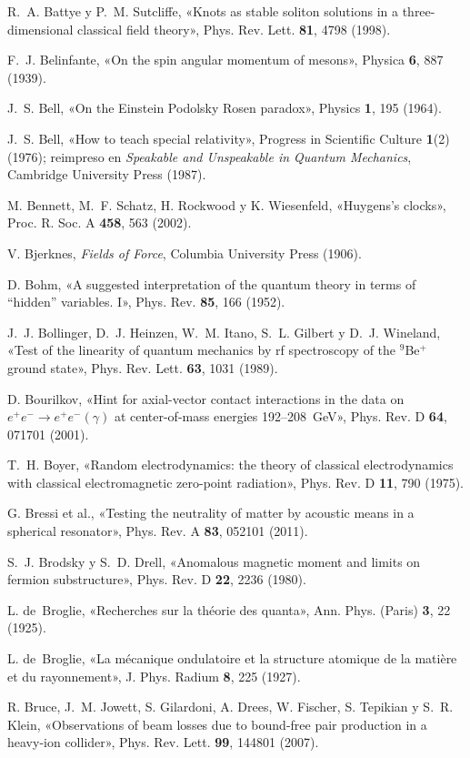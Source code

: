 \documentclass[11pt,a4paper]{article}
\begin{document}
\begin{list}{}{\setlength{\leftmargin}{1.5em}\setlength{\itemindent}{-1.5em}\setlength{\itemsep}{0.15em}\small}
\item R.~A. Battye y P.~M. Sutcliffe, «Knots as stable soliton solutions in a three-dimensional classical field theory», Phys. Rev. Lett. \textbf{81}, 4798 (1998).
\item F.~J. Belinfante, «On the spin angular momentum of mesons», Physica \textbf{6}, 887 (1939).
\item J.~S. Bell, «On the Einstein Podolsky Rosen paradox», Physics \textbf{1}, 195 (1964).
\item J.~S. Bell, «How to teach special relativity», Progress in Scientific Culture \textbf{1}(2) (1976); reimpreso en \emph{Speakable and Unspeakable in Quantum Mechanics}, Cambridge University Press (1987).
\item M. Bennett, M.~F. Schatz, H. Rockwood y K. Wiesenfeld, «Huygens's clocks», Proc. R. Soc. A \textbf{458}, 563 (2002).
\item V. Bjerknes, \emph{Fields of Force}, Columbia University Press (1906).
\item D. Bohm, «A suggested interpretation of the quantum theory in terms of ``hidden'' variables. I», Phys. Rev. \textbf{85}, 166 (1952).
\item J.~J. Bollinger, D.~J. Heinzen, W.~M. Itano, S.~L. Gilbert y D.~J. Wineland, «Test of the linearity of quantum mechanics by rf spectroscopy of the ${}^9$Be$^+$ ground state», Phys. Rev. Lett. \textbf{63}, 1031 (1989).
\item D. Bourilkov, «Hint for axial-vector contact interactions in the data on $e^+e^-\to e^+e^-(\gamma)$ at center-of-mass energies 192--208~GeV», Phys. Rev. D \textbf{64}, 071701 (2001).
\item T.~H. Boyer, «Random electrodynamics: the theory of classical electrodynamics with classical electromagnetic zero-point radiation», Phys. Rev. D \textbf{11}, 790 (1975).
\item G. Bressi et al., «Testing the neutrality of matter by acoustic means in a spherical resonator», Phys. Rev. A \textbf{83}, 052101 (2011).
\item S.~J. Brodsky y S.~D. Drell, «Anomalous magnetic moment and limits on fermion substructure», Phys. Rev. D \textbf{22}, 2236 (1980).
\item L. de~Broglie, «Recherches sur la théorie des quanta», Ann. Phys. (Paris) \textbf{3}, 22 (1925).
\item L. de~Broglie, «La mécanique ondulatoire et la structure atomique de la matière et du rayonnement», J. Phys. Radium \textbf{8}, 225 (1927).
\item R. Bruce, J.~M. Jowett, S. Gilardoni, A. Drees, W. Fischer, S. Tepikian y S.~R. Klein, «Observations of beam losses due to bound-free pair production in a heavy-ion collider», Phys. Rev. Lett. \textbf{99}, 144801 (2007).

\end{list}
\end{document}
